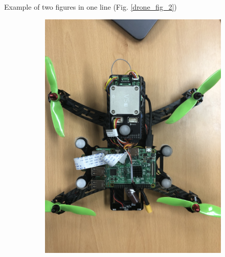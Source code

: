 Example of two figures in one line (Fig. \ref{drone_fig_2})
\begin{figure}
	\centering
	\begin{subfigure}[b]{0.49\textwidth}
		\centering
		\includegraphics[width=\textwidth,keepaspectratio]{Figures/drone_setup.jpg}
	\end{subfigure}
	\begin{subfigure}[b]{0.49\textwidth}
		\centering

\end{subfigure}
\end{figure}
